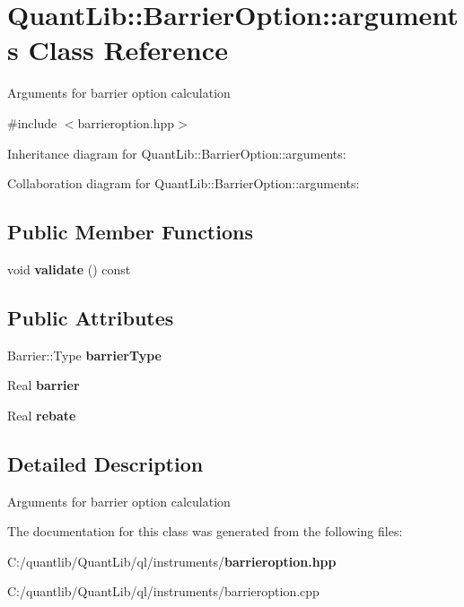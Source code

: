 \section{Quant\+Lib\+:\+:Barrier\+Option\+:\+:arguments Class Reference}
\label{class_quant_lib_1_1_barrier_option_1_1arguments}


Arguments for barrier option calculation  




{\ttfamily \#include $<$barrieroption.\+hpp$>$}



Inheritance diagram for Quant\+Lib\+:\+:Barrier\+Option\+:\+:arguments\+:


Collaboration diagram for Quant\+Lib\+:\+:Barrier\+Option\+:\+:arguments\+:
\subsection*{Public Member Functions}
\begin{DoxyCompactItemize}
\item 
void {\bfseries validate} () const \label{class_quant_lib_1_1_barrier_option_1_1arguments_a0055aa6b499cc57e4d10c0ed59d984e4}

\end{DoxyCompactItemize}
\subsection*{Public Attributes}
\begin{DoxyCompactItemize}
\item 
Barrier\+::\+Type {\bfseries barrier\+Type}\label{class_quant_lib_1_1_barrier_option_1_1arguments_a2bf0f30265216f30ac7fad6479b12c05}

\item 
Real {\bfseries barrier}\label{class_quant_lib_1_1_barrier_option_1_1arguments_aedad56574cc1d09c921fe3c40041801d}

\item 
Real {\bfseries rebate}\label{class_quant_lib_1_1_barrier_option_1_1arguments_a1ab85bcdc6da257ce14550d46261f832}

\end{DoxyCompactItemize}


\subsection{Detailed Description}
Arguments for barrier option calculation 

The documentation for this class was generated from the following files\+:\begin{DoxyCompactItemize}
\item 
C\+:/quantlib/\+Quant\+Lib/ql/instruments/{\bf barrieroption.\+hpp}\item 
C\+:/quantlib/\+Quant\+Lib/ql/instruments/barrieroption.\+cpp\end{DoxyCompactItemize}
